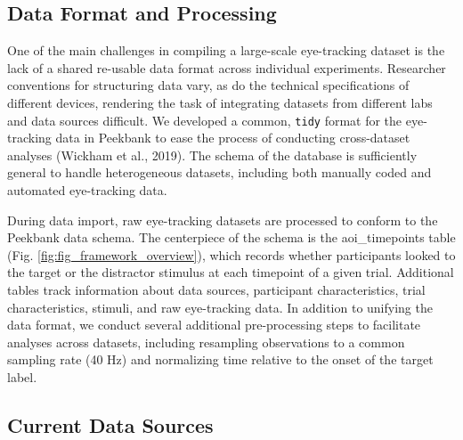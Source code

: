\documentclass[10pt, letterpaper]{article}
\begin{document}
\hypertarget{data-format-and-processing}{%
\subsection{Data Format and
Processing}\label{data-format-and-processing}}

One of the main challenges in compiling a large-scale eye-tracking
dataset is the lack of a shared re-usable data format across individual
experiments. Researcher conventions for structuring data vary, as do the
technical specifications of different devices, rendering the task of
integrating datasets from different labs and data sources difficult. We
developed a common, \texttt{tidy} format for the eye-tracking data in
Peekbank to ease the process of conducting cross-dataset analyses
(Wickham et al., 2019). The schema of the database is sufficiently
general to handle heterogeneous datasets, including both manually coded
and automated eye-tracking data.

During data import, raw eye-tracking datasets are processed to conform
to the Peekbank data schema. The centerpiece of the schema is the
aoi\_timepoints table (Fig. \ref{fig:fig_framework_overview}), which
records whether participants looked to the target or the distractor
stimulus at each timepoint of a given trial. Additional tables track
information about data sources, participant characteristics, trial
characteristics, stimuli, and raw eye-tracking data. In addition to
unifying the data format, we conduct several additional pre-processing
steps to facilitate analyses across datasets, including resampling
observations to a common sampling rate (40 Hz) and normalizing time
relative to the onset of the target label.

\hypertarget{current-data-sources}{%
\subsection{Current Data Sources}\label{current-data-sources}}
\end{document}
